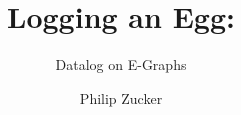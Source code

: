 \documentclass[sigplan,10pt,review]{acmart} %
\begin{document}
\title{Logging an Egg:}         %
\subtitle{Datalog on E-Graphs}                     %



\author{Philip Zucker}

\end{document}
